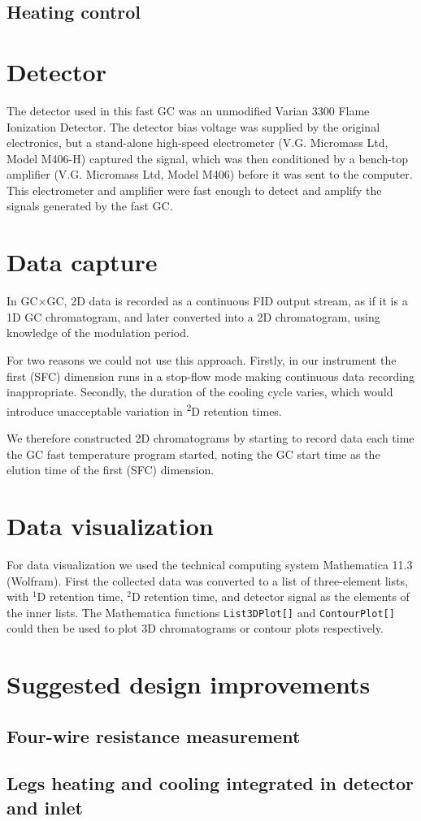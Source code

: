 \subsection{Heating control}

\section{Detector}

The detector used in this fast GC was an unmodified Varian\texttrademark{} 3300
Flame Ionization Detector. The detector bias voltage was supplied by the
original electronics, but a stand-alone high-speed electrometer (V.G. Micromass
Ltd, Model M406-H) captured the signal, which was then conditioned by a
bench-top amplifier (V.G. Micromass Ltd, Model M406) before it was sent to the
computer. This electrometer and amplifier were fast enough to detect and amplify
the signals generated by the fast GC.

\section{Data capture}

In GC×GC, 2D data is recorded as a continuous FID output stream, as if it
is a 1D GC chromatogram, and later converted into a 2D chromatogram, using
knowledge of the modulation period.

For two reasons we could not use this approach. Firstly, in our instrument the
first (SFC) dimension runs in a stop-flow mode making continuous data recording
inappropriate. Secondly, the duration of the cooling cycle varies, which would
introduce unacceptable variation in \textsuperscript{2}D retention times.

We therefore constructed 2D chromatograms by starting to record data each time
the GC fast temperature program started, noting the GC start time as the elution
time of the first (SFC) dimension.

\section{Data visualization}
For data visualization we used the technical computing system Mathematica
11.3\texttrademark{} (Wolfram).  First the collected data was converted to a
list of three-element lists, with $^1$D retention time, $^2$D retention time,
and detector signal as the elements of the inner lists. The Mathematica
functions \texttt{List3DPlot[]} and \texttt{ContourPlot[]} could then be used to
plot 3D chromatograms or contour plots respectively.

\section{Suggested design improvements}

\subsection{Four-wire resistance measurement}
\subsection{Legs heating and cooling integrated in detector and inlet}
\subsection{}

\todos

